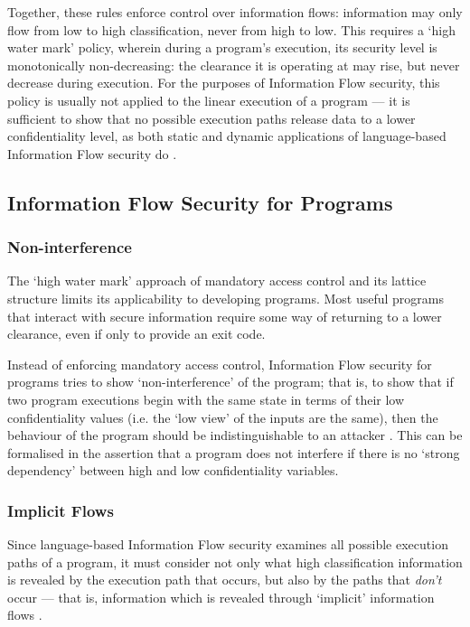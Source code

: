 Together, these rules enforce control over information flows: information may only flow from low to high classification, never from high to low. This requires a `high water mark' \cite{jones1975highwatermark} policy, wherein during a program's execution, its security level is monotonically non-decreasing: the clearance it is operating at may rise, but never decrease during execution. For the purposes of Information Flow security, this policy is usually not applied to the linear execution of a program --- it is sufficient to show that no possible execution paths release data to a lower confidentiality level, as both static and dynamic applications of language-based Information Flow security do \cite{sabelfeld2003if}.

\subsection{Information Flow Security for Programs}

\subsubsection{Non-interference}

The `high water mark' approach of mandatory access control and its lattice structure limits its applicability to developing programs. Most useful programs that interact with secure information require some way of returning to a lower clearance, even if only to provide an exit code.

Instead of enforcing mandatory access control, Information Flow security for programs tries to show `non-interference' of the program; that is, to show that if two program executions begin with the same state in terms of their low confidentiality values (i.e. the `low view' of the inputs are the same), then the behaviour of the program should be indistinguishable to an attacker \cite{sabelfeld2003if}. This can be formalised in the assertion that a program does not interfere if there is no `strong dependency' \cite{cohen1977declassification} between high and low confidentiality variables.

\subsubsection{Implicit Flows}

Since language-based Information Flow security examines all possible execution paths of a program, it must consider not only what high classification information is revealed by the execution path that occurs, but also by the paths that \textit{don't} occur --- that is, information which is revealed through `implicit' information flows \cite{sabelfeld2003if}.

